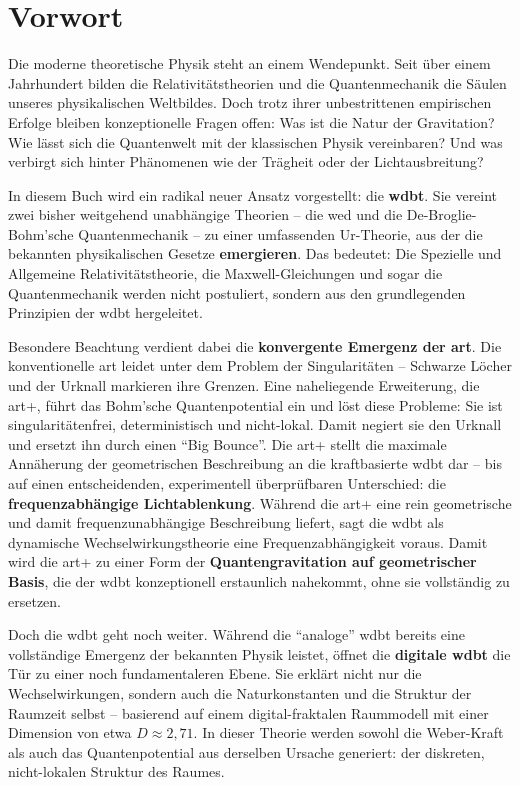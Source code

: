 \documentclass[11pt, a5paper, twoside, openright]{book}
\begin{document}
\chapter*{Vorwort}
Die moderne theoretische Physik steht an einem Wendepunkt. Seit über einem Jahrhundert bilden die Relativitätstheorien und die Quantenmechanik die Säulen unseres physikalischen Weltbildes. Doch trotz
ihrer unbestrittenen empirischen Erfolge bleiben konzeptionelle Fragen offen: Was ist die Natur der Gravitation? Wie lässt sich die Quantenwelt mit der klassischen Physik vereinbaren? Und was verbirgt
sich hinter Phänomenen wie der Trägheit oder der Lichtausbreitung?

In diesem Buch wird ein radikal neuer Ansatz vorgestellt: die \textbf{\gls{wdbt}}. Sie vereint zwei bisher weitgehend unabhängige Theorien – die \gls{wed} und die De-Broglie-Bohm’sche Quantenmechanik – zu einer
umfassenden Ur-Theorie, aus der die bekannten physikalischen Gesetze \textbf{emergieren}. Das bedeutet: Die Spezielle und Allgemeine Relativitätstheorie, die Maxwell-Gleichungen und sogar die Quantenmechanik
werden nicht postuliert, sondern aus den grundlegenden Prinzipien der \gls{wdbt} hergeleitet.

Besondere Beachtung verdient dabei die \textbf{konvergente Emergenz der \gls{art}}. Die konventionelle \gls{art} leidet unter dem Problem der Singularitäten – Schwarze Löcher und der Urknall markieren ihre
Grenzen. Eine naheliegende Erweiterung, die \gls{art}+, führt das Bohm’sche Quantenpotential ein und löst diese Probleme: Sie ist singularitätenfrei, deterministisch und nicht-lokal. Damit negiert sie
den Urknall und ersetzt ihn durch einen \enquote{Big Bounce}. Die \gls{art}+ stellt die maximale Annäherung der geometrischen Beschreibung an die kraftbasierte \gls{wdbt} dar – bis auf einen
entscheidenden, experimentell überprüfbaren Unterschied: die \textbf{frequenzabhängige Lichtablenkung}. Während die \gls{art}+ eine rein geometrische und damit frequenzunabhängige Beschreibung liefert, sagt die
\gls{wdbt} als dynamische Wechselwirkungstheorie eine Frequenzabhängigkeit voraus. Damit wird die \gls{art}+ zu einer Form der \textbf{Quantengravitation auf geometrischer Basis}, die der \gls{wdbt} konzeptionell
erstaunlich nahekommt, ohne sie vollständig zu ersetzen.

Doch die \gls{wdbt} geht noch weiter. Während die \enquote{analoge} \gls{wdbt} bereits eine vollständige Emergenz der bekannten Physik leistet, öffnet die \textbf{digitale \gls{wdbt}} die Tür zu einer
noch fundamentaleren Ebene. Sie erklärt nicht nur die Wechselwirkungen, sondern auch die Naturkonstanten und die Struktur der Raumzeit selbst – basierend auf einem digital-fraktalen Raummodell mit einer
Dimension von etwa $D \approx 2,71$. In dieser Theorie werden sowohl die Weber-Kraft als auch das Quantenpotential aus derselben Ursache generiert: der diskreten, nicht-lokalen Struktur des Raumes.
\end{document}
